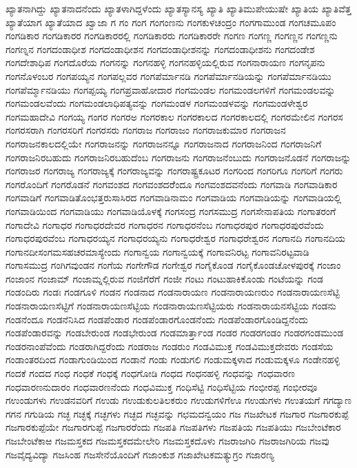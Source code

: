 {ಖ್ಯಾತನಾಗಿದ್ದು
ಖ್ಯಾತನಾದನೆಂದು
ಖ್ಯಾತಳಾಗಿದ್ದಳೆಂದು
ಖ್ಯಾತಸ್ಯಾನಸ್ಯ
ಖ್ಯಾತಿ
ಖ್ಯಾತಿಮುಪೇಯುಷೇ
ಖ್ಯಾತಿಯ
ಖ್ಯಾತಿವೆತ್ತ
ಖ್ಯಾತೆಯಾಗ
ಖ್ಯಾತೆಯಾದ
ಖ್ವಾಜಾ
ಗ
ಗಂ
ಗಂಗ
ಗಂಗಂಣನು
ಗಂಗಕುಳಚಂದ್ರಂ
ಗಂಗಗಾಮುಂಡ
ಗಂಗಚಮೂಪಂ
ಗಂಗಡಿಕಾರ
ಗಂಗಡಿಕಾರರ
ಗಂಗಡಿಕಾರರಲ್ಲಿ
ಗಂಗಡಿಕಾರರು
ಗಂಗಡಿಕಾರರೇ
ಗಂಗಣ
ಗಂಗಣ್ಣ
ಗಂಗಣ್ಣನ
ಗಂಗಣ್ಣನು
ಗಂಗಣ್ನನ
ಗಂಗದಂಡಾಧೀಶ
ಗಂಗದಂಡಾಧೀಶನ
ಗಂಗದಂಡಾಧೀಶನನ್ನು
ಗಂಗದಂಡಾಧೀಶನು
ಗಂಗದಂಡೇಶ
ಗಂಗದೇಶಾಧಿಪ
ಗಂಗದೊರೆಯ
ಗಂಗನನ್ನು
ಗಂಗನಹಳ್ಳಿ
ಗಂಗನಹಳ್ಳಿಯಲ್ಲಿರುವ
ಗಂಗನಾರಾಯಣ
ಗಂಗನೃಪನು
ಗಂಗನೊಳಂಬರ
ಗಂಗಪಯ್ಯನ
ಗಂಗಪಲ್ಲವರ
ಗಂಗಪೆರ್ಮಾನಡಿ
ಗಂಗಪೆರ್ಮಾನಡಿಯನ್ನು
ಗಂಗಪೆರ್ಮಾನಡಿಯು
ಗಂಗಪೆರ್ಮ್ಮಾನಡಿಯು
ಗಂಗಪ್ಪಯ್ಯ
ಗಂಗಪ್ರವಾಹೋದಾರ
ಗಂಗಮಂಡಲ
ಗಂಗಮಂಡಲಗಳಿಗೆ
ಗಂಗಮಂಡಲವನ್ನು
ಗಂಗಮಂಡಲವೆಂದು
ಗಂಗಮಂಡಲಾಧಿಪತ್ಯವನ್ನು
ಗಂಗಮಂಡಳ
ಗಂಗಮಂಡಳವನ್ನು
ಗಂಗಮಂಡಳೇಶ್ವರ
ಗಂಗಮಹಾದೇವಿ
ಗಂಗಯ್ಯ
ಗಂಗರ
ಗಂಗರಅ
ಗಂಗರಕಾಲ
ಗಂಗರಕಾಲದ
ಗಂಗರಕಾಲದಲ್ಲಿ
ಗಂಗರಮೇಲಿನ
ಗಂಗರಸ
ಗಂಗರಸರಾಗಿ
ಗಂಗರಸರಿಗೆ
ಗಂಗರಸರು
ಗಂಗರಾಜ
ಗಂಗರಾಜಂ
ಗಂಗರಾಜಕುಮಾರ
ಗಂಗರಾಜನ
ಗಂಗರಾಜನಕಾಲದಲ್ಲಿಯೇ
ಗಂಗರಾಜನನ್ನು
ಗಂಗರಾಜನನ್ನೂ
ಗಂಗರಾಜನಾದ
ಗಂಗರಾಜನಿಂದ
ಗಂಗರಾಜನಿಗೆ
ಗಂಗರಾಜನಿರಬಹುದು
ಗಂಗರಾಜನಿರಬಹುದೆಂಬ
ಗಂಗರಾಜನು
ಗಂಗರಾಜನೆಂಬುದು
ಗಂಗರಾಜನೊಡನೆ
ಗಂಗರಾಜನ್ನು
ಗಂಗರಾಜರ
ಗಂಗರಾಜ್ಯ
ಗಂಗರಾಜ್ಯಕ್ಕೆ
ಗಂಗರಾಜ್ಯವನ್ನು
ಗಂಗರಾಷ್ಟ್ರಕೂಟರ
ಗಂಗರಿಂದ
ಗಂಗರಿಗೂ
ಗಂಗರಿಗೆ
ಗಂಗರು
ಗಂಗರೊಂದಿಗೆ
ಗಂಗರೊಡನೆ
ಗಂಗವಂಶದ
ಗಂಗವಂಶದರೆೆಂದೂ
ಗಂಗವಂಶದವನೆಂದು
ಗಂಗವಾಡಿ
ಗಂಗವಾಡಿಕಾರ
ಗಂಗವಾಡಿಗೆ
ಗಂಗವಾಡಿತೊಂಭತ್ತರುಸಾಸಿರದ
ಗಂಗವಾಡಿನಾಮಂ
ಗಂಗವಾಡಿಯ
ಗಂಗವಾಡಿಯನ್ನು
ಗಂಗವಾಡಿಯಲ್ಲಿ
ಗಂಗವಾಡಿಯಿಂದ
ಗಂಗವಾಡಿಯು
ಗಂಗವಾಡಿಯೊಳಕ್ಕೆ
ಗಂಗಸಂದ್ರ
ಗಂಗಸಮುದ್ರ
ಗಂಗಸೇನಾಪತಿಯ
ಗಂಗಾತರಂಗೆ
ಗಂಗಾದೇವಿ
ಗಂಗಾಧರ
ಗಂಗಾಧರದೇವರ
ಗಂಗಾಧರನ
ಗಂಗಾಧರನೆಂಬ
ಗಂಗಾಧರಪುರ
ಗಂಗಾಧರಪುರವೆಂದು
ಗಂಗಾಧರಪುರವೆಂಬ
ಗಂಗಾಧರಯ್ಯನ
ಗಂಗಾಧರಯ್ಯನು
ಗಂಗಾಧರೇಶ್ವರ
ಗಂಗಾಧರೇಶ್ವರನ
ಗಂಗಾನದಿ
ಗಂಗಾನದಿಯ
ಗಂಗಾನದೀಸಂಗಮಸಹಚರಮಾಸ್ಯೇಂದು
ಗಂಗಾನ್ವಯ
ಗಂಗಾನ್ವಯಕ್ಕೆ
ಗಂಗಾವನಿರಟ್ಟ
ಗಂಗಾವನಿರಟ್ಟವಾಡಿ
ಗಂಗಾಸಮುದ್ರ
ಗಂಗಿಗವುಂಡನ
ಗಂಗೆಯ
ಗಂಗೇಗೌಡ
ಗಂಗೇಶ್ವರ
ಗಂಗೈಕೊಂಡ
ಗಂಗೈಕೊಂಡಚೋಳಪುರಕ್ಕೆ
ಗಂಜಾಂ
ಗಂಜಾಂನ
ಗಂಜಾಮ್
ಗಂಜಾಮ್ನಲ್ಲಿರುವ
ಗಂಜಿಗೆರೆಗೆ
ಗಂಜೀ
ಗಂಟು
ಗಂಟುಹಾಕಿಕೊಂಡು
ಗಂಟೆಯನ್ನು
ಗಂಡ
ಗಂಡಂದಿರು
ಗಂಡಃ
ಗಂಡಗೂಳಿ
ಗಂಡನ
ಗಂಡನಾದ
ಗಂಡನಾರಾಯಣ
ಗಂಡನಾರಾಯಣರುಂ
ಗಂಡನಾರಾಯಣಸೆಟ್ಟಿ
ಗಂಡನಾರಾಯಣಸೆಟ್ಟಿಗೆ
ಗಂಡನಾರಾಯಣಸೆಟ್ಟಿಯ
ಗಂಡನಾರಾಯಣಸೆಟ್ಟಿಯರು
ಗಂಡನಾರಾಯನಸೆಟ್ಟಿಯ
ಗಂಡನು
ಗಂಡನೆಂದೂ
ಗಂಡನೆನಿಸಿದ
ಗಂಡಪೆಂಡಾರ
ಗಂಡಪೆಂಡಾರಗೊಂಡನೆಂದು
ಗಂಡಪೆಂಡಾರಗೊಂಡಿದ್ದನೆಂದು
ಗಂಡಪೆಂಡಾರವನ್ನು
ಗಂಡಬೇರುಂಡ
ಗಂಡಭೇರುಂಡ
ಗಂಡಮಾರ್ತ್ತಾಂಡ
ಗಂಡರ
ಗಂಡರಗಂಡಂ
ಗಂಡರಗಂಡಮುಂಡ
ಗಂಡರನಾಂಪೆವೆಂದು
ಗಂಡರಾಗಿದ್ದರೆಂದು
ಗಂಡರಾಜ
ಗಂಡರುಂ
ಗಂಡವಿಮುಕ್ತ
ಗಂಡವಿಮುಕ್ತದೇವರು
ಗಂಡಸೆಯ
ಗಂಡಾಂತರದಿಂದ
ಗಂಡಾಗುಂಡಿಯಿಂದ
ಗಂಡಾನೆ
ಗಂಡು
ಗಂಡುಗಲಿ
ಗಂಡುಮಕ್ಕಳಾದ
ಗಂಡುಮಕ್ಕಳೂ
ಗಂಡೇನಹಳ್ಳಿ
ಗಂದಕೆ
ಗಂದದ
ಗಂಧ
ಗಂಧಕೆ
ಗಂಧಕ್ಕೆ
ಗಂಧಗೋಡಿ
ಗಂಧದ
ಗಂಧನಹಳ್ಳಿ
ಗಂಧವನ್ನು
ಗಂಧವಾರಣ
ಗಂಧವಾರಣನುದಾರಂ
ಗಂಧವಾರಣನೆಂದು
ಗಂಧವಿಮುಕ್ತ
ಗಂಧಿಸೆಟ್ಟಿ
ಗಂಧಿಸೆಟ್ಟಿಯ
ಗಂಭೀರಪ್ಪ
ಗಂಭೀರವೂ
ಗಉಂಡುಗಳು
ಗಉಡನವರಿಗೆ
ಗಉಡು
ಗಉಡುಕುಲತಿಲಕರುಂ
ಗಉಡುಗಳಿಗೆಊ
ಗಉಡುಗಳು
ಗಉತಯಗೆ
ಗಗದ್ಯಾಣ
ಗಗನ
ಗಗುಡಿಯ
ಗಚ್ಛ
ಗಚ್ಛಕ್ಕೆ
ಗಚ್ಛಗಳು
ಗಚ್ಛದ
ಗಚ್ಛವನ್ನು
ಗಛಮದನ್ವಯಂ
ಗಜ
ಗಜಖೇಟಕ
ಗಜಗಾರ
ಗಜಗಾರಕುಪ್ಪೆ
ಗಜಗಾರಕುಪ್ಪೆಯೇ
ಗಜಗಾರಗುಪ್ಪೆ
ಗಜಗಾರರೆಂದು
ಗಜಪತಿ
ಗಜಪತಿಗಳು
ಗಜಪತಿಯ
ಗಜಪತಿಯು
ಗಜಬೇಂಟೆಕಾರ
ಗಜಬೇಂಟೆಕಾಱ
ಗಜಮಸ್ತಕದ
ಗಜಮಸ್ತಕದಮೇಲೇರಿ
ಗಜಮಸ್ತಕದೊಳು
ಗಜರಾಜಗಿರಿ
ಗಜರಾಜಗಿರಿಯ
ಗಜವು
ಗಜವೈದ್ಯವಿದ್ಯಾ
ಗಜಸಿಂಹ
ಗಜಸೇನೆಯೊಂದಿಗೆ
ಗಜಾಂಕುಶ
ಗಜಾಖೇಟಕಮತ್ಯುಗ್ರಂ
ಗಜಾರಣ್ಯ
}

